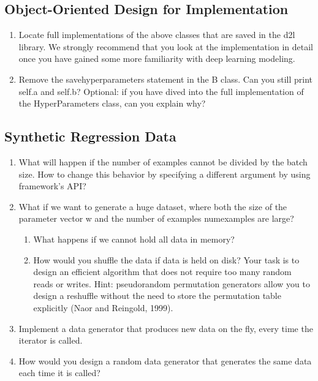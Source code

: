 \documentclass{article}
\begin{document}
\subsection{Object-Oriented Design for Implementation}
\begin{enumerate}
	\item Locate full implementations of the above classes that are saved in the d2l library. We strongly recommend that you look at the implementation in detail once you have gained some more familiarity with deep learning modeling.

    \item Remove the savehyperparameters statement in the B class. Can you still print self.a and self.b? Optional: if you have dived into the full implementation of the HyperParameters class, can you explain why?
\end{enumerate}

\subsection{Synthetic Regression Data}
\begin{enumerate}
	\item  What will happen if the number of examples cannot be divided by the batch size. How to change this behavior by specifying a different argument by using framework’s API?


	\item What if we want to generate a huge dataset, where both the size of the parameter vector w and the number of examples numexamples are large?

	\begin{enumerate}
		\item What happens if we cannot hold all data in memory?

		\item How would you shuffle the data if data is held on disk? Your task is to design an efficient algorithm that does not require too many random reads or writes. Hint: pseudorandom permutation generators allow you to design a reshuffle without the need to store the permutation table explicitly (Naor and Reingold, 1999).
	\end{enumerate}

    \item Implement a data generator that produces new data on the fly, every time the iterator is called.

    \item How would you design a random data generator that generates the same data each time it is called?
\end{enumerate}
\end{document}
